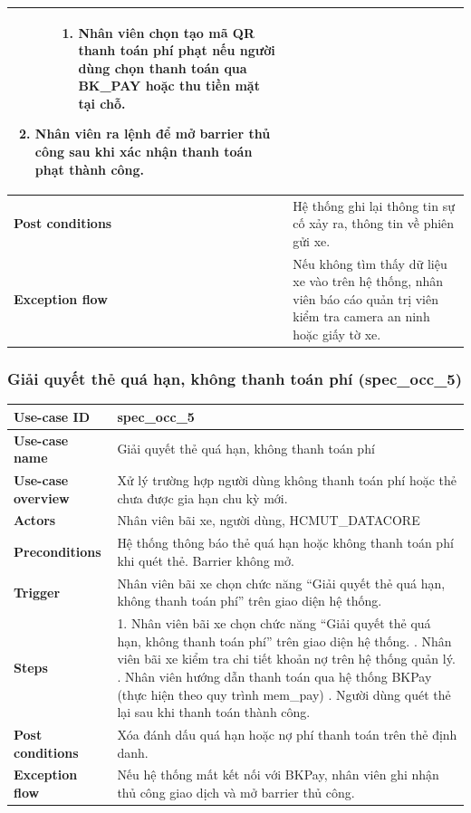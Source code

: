 \begin{longtable}{|>{\centering\arraybackslash}m{3cm}|m{13.7cm}|}
\begin{enumerate}[label=\arabic*., leftmargin=1.5em, nosep]
\begin{enumerate}[label=2.\arabic*., leftmargin=2em, nosep]
\begin{enumerate}[label=2.2.\arabic*., leftmargin=2.5em, nosep]
            \item Nhân viên chọn tạo mã QR thanh toán phí phạt nếu người dùng chọn thanh toán qua BK\_PAY hoặc thu tiền mặt tại chỗ.
        \end{enumerate}
    \end{enumerate}
    \item Nhân viên ra lệnh để mở barrier thủ công sau khi xác nhận thanh toán phạt thành công.
\end{enumerate} \\ \hline
\textbf{Post conditions} & Hệ thống ghi lại thông tin sự cố xảy ra, thông tin về phiên gửi xe. \\ \hline
\textbf{Exception flow} & Nếu không tìm thấy dữ liệu xe vào trên hệ thống, nhân viên báo cáo quản trị viên kiểm tra camera an ninh hoặc giấy tờ xe. \\ \hline
\end{longtable}
\endgroup

\subsubsection{Giải quyết thẻ quá hạn, không thanh toán phí (spec\_occ\_5)}
\begingroup
\small
\begin{longtable}{|>{\centering\arraybackslash}m{3cm}|m{13.7cm}|}
\hline
\textbf{Use-case ID} & spec\_occ\_5   \\ \hline
\textbf{Use-case name} & Giải quyết thẻ quá hạn, không thanh toán phí   \\ \hline
\textbf{Use-case overview} & Xử lý trường hợp người dùng không thanh toán phí hoặc thẻ chưa được gia hạn chu kỳ mới. \\ \hline
\textbf{Actors} & Nhân viên bãi xe, người dùng, HCMUT\_DATACORE \\ \hline
\textbf{Preconditions} & Hệ thống thông báo thẻ quá hạn hoặc không thanh toán phí khi quét thẻ. Barrier không mở.   \\ \hline
\textbf{Trigger} & Nhân viên bãi xe chọn chức năng “Giải quyết thẻ quá hạn, không thanh toán phí” trên giao diện hệ thống. \\ \hline
\textbf{Steps} & 
1. Nhân viên bãi xe chọn chức năng “Giải quyết thẻ quá hạn, không thanh toán phí” trên giao diện hệ thống. \newline
2. Nhân viên bãi xe kiểm tra chi tiết khoản nợ trên hệ thống quản lý. \newline
3. Nhân viên hướng dẫn thanh toán qua hệ thống BKPay (thực hiện theo quy trình mem\_pay) \newline
4. Người dùng quét thẻ lại sau khi thanh toán thành công. \\ \hline
\textbf{Post conditions} & Xóa đánh dấu quá hạn hoặc nợ phí thanh toán trên thẻ định danh. \\ \hline
\textbf{Exception flow} & Nếu hệ thống mất kết nối với BKPay, nhân viên ghi nhận thủ công giao dịch và mở barrier thủ công. \\ \hline
\end{longtable}
\endgroup

